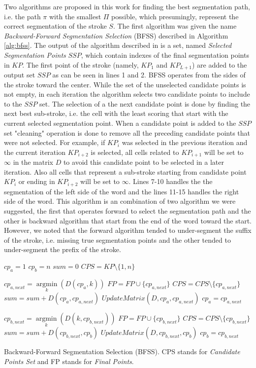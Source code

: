 \documentclass[journal,compsoc]{IEEEtran}
\begin{document}
Two algorithms are proposed in this work for finding the best segmentation path, i.e. the path $\pi$ with the smallest $\Pi$ possible, which  presumingly, represent the correct segmentation of the stroke $S$. The first algorithm was given the name \emph{Backward-Forward Segmentation Selection} (BFSS) described in Algorithm \ref{alg:bfss}. The output of the algorithm described in is a set, named \emph{Selected Segmentation Points} $SSP$, which contain indexes of the final segmentation points in $KP$. The first point of the stroke (namely, $KP_1$ and $KP_{L+1}$) are added to the output set $SSP$ as can be seen in lines 1 and 2. BFSS operates from the sides of the stroke toward the center. While the set of the unselected candidate points is not empty, in each iteration the algorithm selects two candidate points to include to the $SSP$ set. The selection of a the next candidate point is done by finding the next best sub-stroke, i.e. the cell with the least scoring that start with the current selected segmentation point.
When a candidate point is added to the $SSP$ set "cleaning" operation is done to remove all the preceding candidate points that were not selected. For example, if $KP_{i}$ was selected in the previous iteration and the current iteration $KP_{i+2}$ is selected, all cells related to $KP_{i+1}$ will be set to $\infty$ in the matrix $D$ to avoid this candidate point to be selected in a later iteration. Also all cells that represent a sub-stroke starting from candidate point $KP_i$ or ending in $KP_{i+2}$ will be set to $\infty$. Lines 7-10 handles the the segmentation of the left side of the word and the lines 11-15 handles the right side of the word. This algorithm is an combination of two algorithm we were suggested, the first that operates forward to select the segmentation path and the other is backward algorithm that start from the end of the word toward the start. However, we noted that the forward algorithm tended to under-segment the suffix of the stroke, i.e. missing true segmentation points and the other tended to under-segment the prefix of the stroke.  

\begin{algorithm}
$cp_{a}=1$\;
$cp_{b}=n$\;
$sum = 0$\;
$CPS = KP\setminus\{1,n\}$\;
{
	$cp_{a,next} = \mathop {\arg \min}\limits_k (D(cp_a,k))$\;
	$FP = FP \cup \{cp_{a,next}\}$\;
	$CPS = CPS\setminus\{cp_{a,next}\}$\;
	$sum = sum + D(cp_a,cp_{a,next})$\;
	$UpdateMatrix(D,cp_a,cp_{a,next})$\;
	$cp_{a}=cp_{a,next}$\;
	
	$cp_{b,next} = \mathop {\arg \min}\limits_k (D(k,cp_{b,next}))$\;
	$FP = FP \cup \{cp_{b,next}\}$\;
	$CPS = CPS\setminus\{cp_{b,next}\}$\;
	$sum = sum + D(cp_{b,next},cp_b)$\;
	$UpdateMatrix(D,cp_{b,next},cp_b)$\;
	$cp_{b}=cp_{b,next}$\;
}
\caption{Backward-Forward Segmentation Selection (BFSS). CPS stands for \emph{Candidate Points Set} and FP stands for \emph{Final Points}. }
\label{alg:bfss}
\end{algorithm}
  
\end{document}
